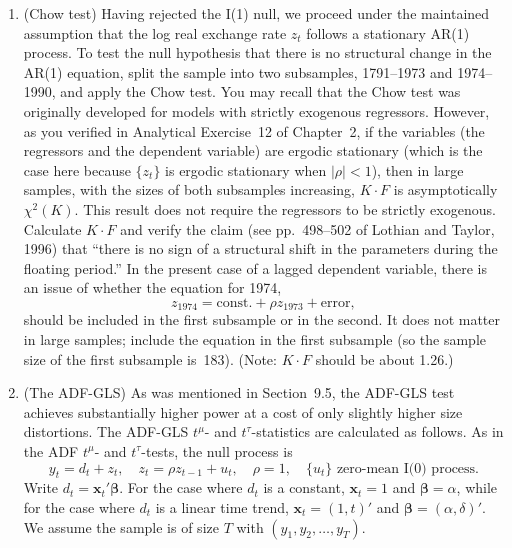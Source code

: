\begin{problemset}
\begin{enumerate}[label=(\alph*)]
\item (Chow test) \enspace Having rejected the I(1) null, we proceed under the maintained
assumption that the log real exchange rate $z_t$ follows a stationary AR(1) process. To test the null hypothesis that there is no structural change in the AR(1)
equation, split the sample into two subsamples, 1791--1973 and 1974--1990,
and apply the Chow test. You may recall that the Chow test was originally
developed for models with strictly exogenous regressors. However, as you verified in Analytical Exercise~12 of Chapter~2, if the variables (the regressors and the dependent variable)
are ergodic stationary (which is the case here because $\{z_t\}$ is ergodic stationary when $|\rho| < 1$), then in large samples, with the sizes of both subsamples
increasing, $K \cdot F$ is asymptotically $\chi^2(K)$. This result does not require the
regressors to be strictly exogenous. Calculate $K \cdot F$ and verify the claim (see
pp.~498--502 of Lothian and Taylor, 1996) that ``there is no sign of a structural
shift in the parameters during the floating period.'' In the present case of a
lagged dependent variable, there is an issue of whether the equation for 1974,
\[
z_{1974} = \text{const.} + \rho z_{1973} + \text{error},
\]
should be included in the first subsample or in the second. It does not matter in
large samples; include the equation in the first subsample (so the sample size
of the first subsample is~183). (Note: $K \cdot F$ should be about 1.26.)

\item (The ADF-GLS) \enspace As was mentioned in Section~9.5, the ADF-GLS test achieves
substantially higher power at a cost of only slightly higher size distortions. The
ADF-GLS $t^\mu$- and $t^\tau$-statistics are calculated as follows. As in the ADF $t^\mu$- and
$t^\tau$-tests, the null process is
\[
y_t = d_t + z_t, \quad z_t = \rho z_{t-1} + u_t, \quad
\rho = 1, \quad \{u_t\} \text{ zero-mean I(0) process.}
\tag{3}
\]
Write $d_t = \mathbf{x}_t'\bm{\beta}$. For the case where $d_t$ is a constant, $\mathbf{x}_t = 1$ and $\bm{\beta} = \alpha$, while
for the case where $d_t$ is a linear time trend, $\mathbf{x}_t = (1, t)'$ and $\bm{\beta} = (\alpha, \delta)'$. We
assume the sample is of size $T$ with $(y_1, y_2, \ldots, y_T)$.


\end{enumerate}
\end{problemset}
